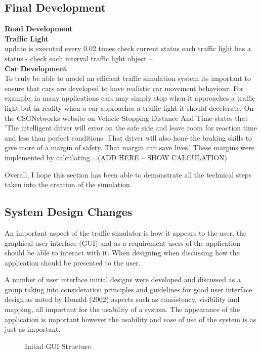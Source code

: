 \documentclass[11pt]{article}
\begin{document}
	\subsection{Final Development}
	\textbf{Road Development}\\
	\textbf{Traffic Light}\\
	update is executed every 0.02 times 
	check current status
	each traffic light has a status - check each interval 
	traffic light object -- \\
	\textbf{Car Development}\\
	To truly be able to model an efficient traffic simulation system its important to ensure that cars are developed to have realistic car movement behaviour. For example, in many applications cars may simply stop when it approaches a traffic light but in reality when a car approaches a traffic light it should decelerate. On the CSGNetworks website on Vehicle Stopping Distance And Time \cite{CSGNetwork} states that 'The intelligent driver will error on the safe side and leave room for reaction time and less than perfect conditions. That driver will also hone the braking skills to give more of a margin of safety. That margin can save lives.' These margins were implemented by calculating....(ADD HERE -- SHOW CALCULATION)

	Overall, I hope this section has been able to demonstrate all the technical steps taken into the creation of the simulation. 
	
	\subsection{System Design Changes}
	An important aspect of the traffic simulator is how it appears to the user, the graphical user interface (GUI) and as a requirement users of the application should be able to interact with it. When designing when discussing how the application should be presented to the user.
	
	A number of user interface initial designs were developed and discussed as a group taking into consideration principles and guidelines for good user interface design as noted by Donald \cite{Norman} (2002) aspects such as consistency, visibility and mapping, all important for the usability of a system. The appearance of the application is important however the usability and ease of use of the system is as just as important.
	\begin{figure}[h]
	\caption{Initial GUI Structure}
	\label{initialGUI}
	\end{figure}
	
\end{document}
